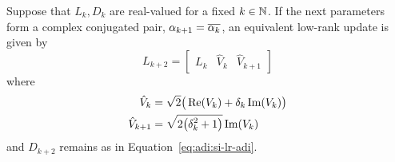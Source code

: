 \begin{corollary}
  Suppose that $L_k, D_k$ are real-valued for a fixed $k\in\N$.
  If the next parameters form a complex conjugated pair,
  $\alpha_{k+1} = \conj{\alpha_k}$,
  an equivalent low-rank update is given by
  \begin{equation*}
    L_{k+2} = \begin{bmatrix}
      L_k &
      \hat V_k &
      \hat V_{k+1}
    \end{bmatrix}
  \end{equation*}
  where
  \begin{align*}
    \hat V_k &= \sqrt{2} \big( \Re(V_k) + \delta_k \Im(V_k) \big) \\
    \hat V_{k+1} &= \sqrt{\smash[b]{2\big( \delta_k^2 + 1 \big)}} \Im(V_k)
  \end{align*}
  and $D_{k+2}$ remains as in Equation~\eqref{eq:adi:si-lr-adi}.
\end{corollary}
